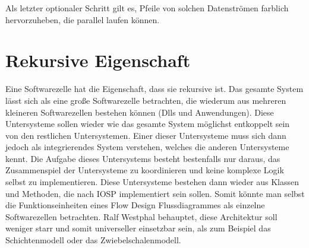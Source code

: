 Als letzter optionaler Schritt gilt es, Pfeile von solchen Datenströmen farblich hervorzuheben, die
parallel laufen können.

\section{Rekursive Eigenschaft}

Eine Softwarezelle hat die Eigenschaft, dass sie rekursive ist.
Das gesamte System lässt sich als eine große Softwarezelle betrachten, die wiederum
aus mehreren kleineren Softwarezellen bestehen können (Dlls und Anwendungen).
Diese Untersysteme sollen wieder wie das gesamte System möglichst entkoppelt
sein von den restlichen Untersystemen. Einer dieser Untersysteme muss sich dann
jedoch als integrierendes System verstehen, welches die anderen Untersysteme
kennt. Die Aufgabe dieses Untersystems besteht bestenfalls nur daraus, das
Zusammenspiel der Untersysteme zu koordinieren und keine komplexe Logik selbst zu implementieren.
Diese Untersysteme bestehen dann wieder aus Klassen und Methoden, die nach IOSP
implementiert sein sollen.
Somit könnte man selbst die Funktionseinheiten eines Flow Design
Flussdiagrammes als einzelne Softwarezellen betrachten.
Ralf Westphal behauptet, diese Architektur soll weniger starr und somit
universeller einsetzbar sein, als zum Beispiel das Schichtenmodell oder das Zwiebelschalenmodell.